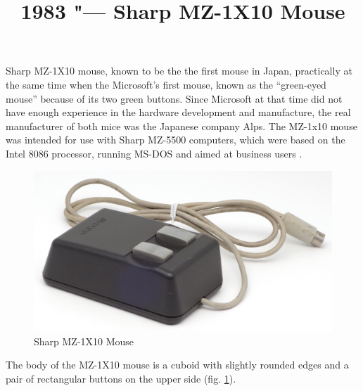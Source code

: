 \documentclass[11pt, a4paper]{article}
\begin{document}
\title{1983 "--- Sharp MZ-1X10 Mouse}
\date{}
\maketitle
{}

Sharp MZ-1X10 mouse, known to be the the first mouse in  Japan, practically at the same time when the Microsoft's first mouse, known as the ``green-eyed mouse'' because of its two green buttons. Since Microsoft at that time did not have enough experience in the hardware development and manufacture, the real manufacturer of both mice was the Japanese company Alps. The MZ-1x10 mouse was intended for use with Sharp MZ-5500 computers, which were based on the Intel 8086 processor, running MS-DOS and aimed at business users \cite{review, wiki}.

\begin{figure}[h]
   \centering
    \includegraphics[scale=0.7]{1983_sharp_mz_1x10_mouse/pic_30.jpg}
    \caption{Sharp MZ-1X10 Mouse}
    \label{fig:SharpMZ1x10Pic}
\end{figure}

The body of the MZ-1X10 mouse is a cuboid with slightly rounded edges and a pair of rectangular buttons on the upper side (fig. \ref{fig:SharpMZ1x10Pic}).
\end{document}
